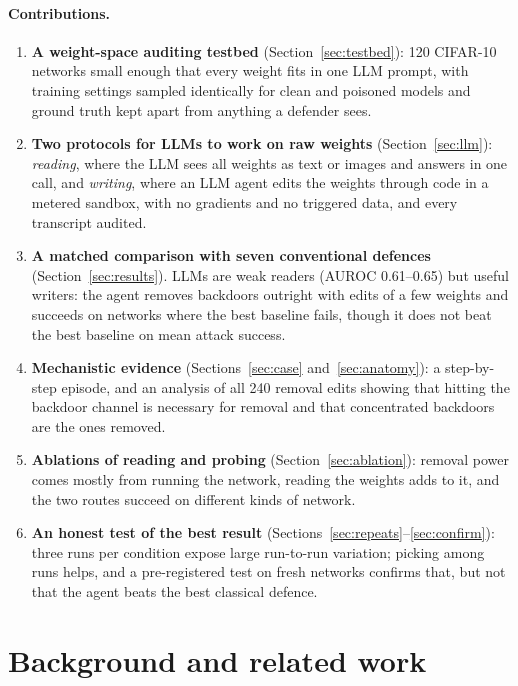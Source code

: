 \documentclass[11pt]{article}
\begin{document}
\paragraph{Contributions.}
\begin{enumerate}[leftmargin=*]
  \item \textbf{A weight-space auditing testbed} (Section~\ref{sec:testbed}): 120 CIFAR-10 networks
    small enough that every weight fits in one LLM prompt, with training settings sampled
    identically for clean and poisoned models and ground truth kept apart from anything a defender
    sees.
  \item \textbf{Two protocols for LLMs to work on raw weights} (Section~\ref{sec:llm}):
    \emph{reading}, where the LLM sees all weights as text or images and answers in one call, and
    \emph{writing}, where an LLM agent edits the weights through code in a metered sandbox, with no
    gradients and no triggered data, and every transcript audited.
  \item \textbf{A matched comparison with seven conventional defences} (Section~\ref{sec:results}).
    LLMs are weak readers (AUROC 0.61--0.65) but useful writers: the agent removes backdoors outright with
    edits of a few weights and succeeds on networks where the best baseline fails, though it does not
    beat the best baseline on mean attack success.
  \item \textbf{Mechanistic evidence} (Sections~\ref{sec:case} and~\ref{sec:anatomy}): a step-by-step
    episode, and an analysis of all 240 removal edits showing that hitting the backdoor channel is
    necessary for removal and that concentrated backdoors are the ones removed.
  \item \textbf{Ablations of reading and probing} (Section~\ref{sec:ablation}): removal power comes mostly
    from running the network, reading the weights adds to it, and the two routes succeed on different
    kinds of network.
  \item \textbf{An honest test of the best result} (Sections~\ref{sec:repeats}--\ref{sec:confirm}): three
    runs per condition expose large run-to-run variation; picking among runs helps, and a pre-registered
    test on fresh networks confirms that, but not that the agent beats the best classical defence.
\end{enumerate}

\section{Background and related work}
\end{document}
